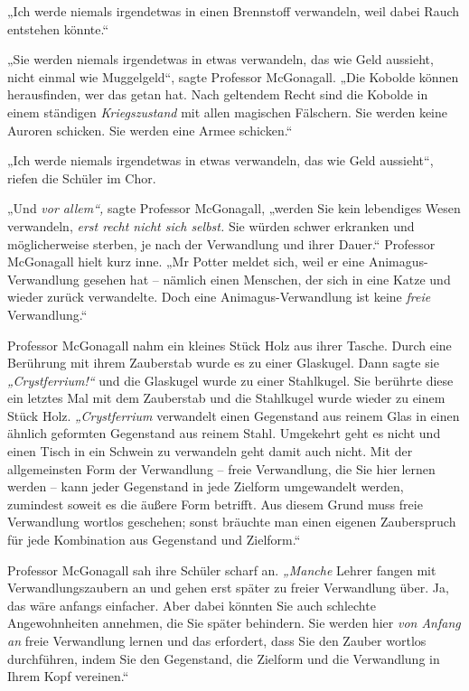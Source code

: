 {„Ich werde niemals irgendetwas in einen Brennstoff verwandeln, weil dabei Rauch entstehen könnte.“

„Sie werden niemals irgendetwas in etwas verwandeln, das wie Geld aussieht, nicht einmal wie Muggelgeld“, sagte Professor McGonagall. „Die Kobolde können herausfinden, wer das getan hat. Nach geltendem Recht sind die Kobolde in einem ständigen \emph{Kriegszustand} mit allen magischen Fälschern. Sie werden keine Auroren schicken. Sie werden eine Armee schicken.“

„Ich werde niemals irgendetwas in etwas verwandeln, das wie Geld aussieht“, riefen die Schüler im Chor.

„Und \emph{vor allem“,} sagte Professor McGonagall, „werden Sie kein lebendiges Wesen verwandeln, \emph{erst recht nicht sich selbst.} Sie würden schwer erkranken und möglicherweise sterben, je nach der Verwandlung und ihrer Dauer.“ Professor McGonagall hielt kurz inne. „Mr Potter meldet sich, weil er eine Animagus-Verwandlung gesehen hat -- nämlich einen Menschen, der sich in eine Katze und wieder zurück verwandelte. Doch eine Animagus-Verwandlung ist keine \emph{freie} Verwandlung.“

Professor McGonagall nahm ein kleines Stück Holz aus ihrer Tasche. Durch eine Berührung mit ihrem Zauberstab wurde es zu einer Glaskugel. Dann sagte sie \emph{„Crystferrium!“} und die Glaskugel wurde zu einer Stahlkugel. Sie berührte diese ein letztes Mal mit dem Zauberstab und die Stahlkugel wurde wieder zu einem Stück Holz. \emph{„Crystferrium} verwandelt einen Gegenstand aus reinem Glas in einen ähnlich geformten Gegenstand aus reinem Stahl. Umgekehrt geht es nicht und einen Tisch in ein Schwein zu verwandeln geht damit auch nicht. Mit der allgemeinsten Form der Verwandlung -- freie Verwandlung, die Sie hier lernen werden -- kann jeder Gegenstand in jede Zielform umgewandelt werden, zumindest soweit es die äußere Form betrifft. Aus diesem Grund muss freie Verwandlung wortlos geschehen; sonst bräuchte man einen eigenen Zauberspruch für jede Kombination aus Gegenstand und Zielform.“

Professor McGonagall sah ihre Schüler scharf an. \emph{„Manche} Lehrer fangen mit Verwandlungszaubern an und gehen erst später zu freier Verwandlung über. Ja, das wäre anfangs einfacher. Aber dabei könnten Sie auch schlechte Angewohnheiten annehmen, die Sie später behindern. Sie werden hier \emph{von Anfang an} freie Verwandlung lernen und das erfordert, dass Sie den Zauber wortlos durchführen, indem Sie den Gegenstand, die Zielform und die Verwandlung in Ihrem Kopf vereinen.“

}
